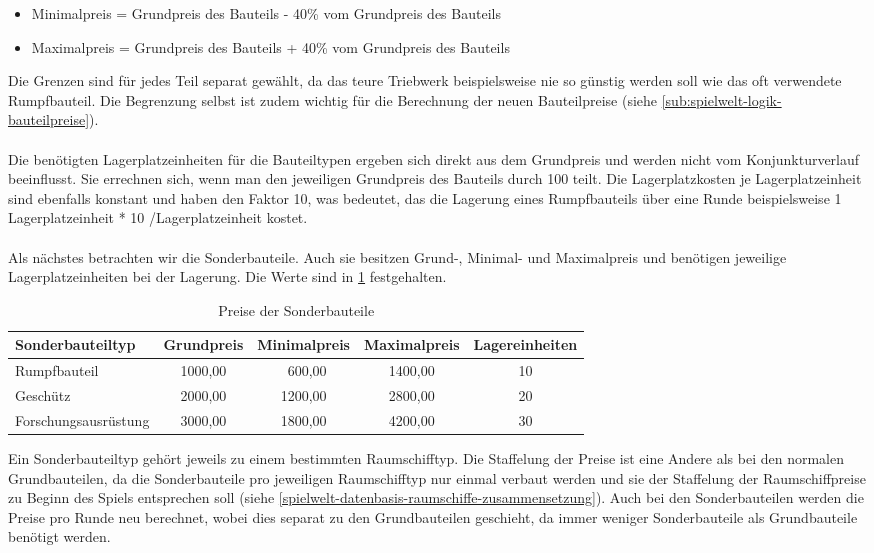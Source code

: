 \begin{itemize}
\item[] Minimalpreis = Grundpreis des Bauteils - 40\% vom Grundpreis des Bauteils
\item[] Maximalpreis = Grundpreis des Bauteils + 40\% vom Grundpreis des Bauteils
\end{itemize}

Die Grenzen sind für jedes Teil separat gewählt, da das teure Triebwerk beispielsweise nie so günstig werden soll wie das oft verwendete Rumpfbauteil. Die Begrenzung selbst ist zudem wichtig für die Berechnung der neuen Bauteilpreise (siehe \ref{sub:spielwelt-logik-bauteilpreise}). 
\\
\\
Die benötigten Lagerplatzeinheiten für die Bauteiltypen ergeben sich direkt aus dem Grundpreis und werden nicht vom Konjunkturverlauf beeinflusst. Sie errechnen sich, wenn man den jeweiligen Grundpreis des Bauteils durch 100 teilt. Die Lagerplatzkosten je Lagerplatzeinheit sind ebenfalls konstant und haben den Faktor 10, was bedeutet, das die Lagerung eines Rumpfbauteils über eine Runde beispielsweise 1 Lagerplatzeinheit * 10  \curr{}/Lagerplatzeinheit kostet.
\\
\\ 
Als nächstes betrachten wir die Sonderbauteile. Auch sie besitzen Grund-, Minimal- und Maximalpreis und benötigen jeweilige Lagerplatzeinheiten bei der Lagerung. Die Werte sind in \ref{tab:spielwelt-datenbasis-raumschiffe-raumschiffbauteile-1} festgehalten.

\begin{table}[htb]\small
     \centering
     \begin{tabular}{ | l | c | c | c | c |   }
          \hline
          Sonderbauteiltyp & Grundpreis & Minimalpreis & Maximalpreis & Lagereinheiten \\
          \hline \hline
          Rumpfbauteil & 1000,00\curr{} & \ 600,00\curr{} & 1400,00\curr{} & 10 \\ \hline
          Geschütz & 2000,00\curr{} & 1200,00\curr{} & 2800,00\curr{} & 20 \\ \hline
          Forschungsausrüstung & 3000,00\curr{} & 1800,00\curr{} & 4200,00\curr{} & 30 \\
          \hline
     \end{tabular}
     \caption{Preise der Sonderbauteile}
     \label{tab:spielwelt-datenbasis-raumschiffe-raumschiffbauteile-1}
\end{table}

Ein Sonderbauteiltyp gehört jeweils zu einem bestimmten Raumschifftyp. Die Staffelung der Preise ist eine Andere als bei den normalen Grundbauteilen, da die Sonderbauteile pro jeweiligen Raumschifftyp nur einmal verbaut werden und sie der Staffelung der Raumschiffpreise zu Beginn des Spiels entsprechen soll (siehe \ref{spielwelt-datenbasis-raumschiffe-zusammensetzung}). Auch bei den Sonderbauteilen werden die Preise pro Runde neu berechnet, wobei dies separat zu den Grundbauteilen geschieht, da immer weniger Sonderbauteile als Grundbauteile benötigt werden.




